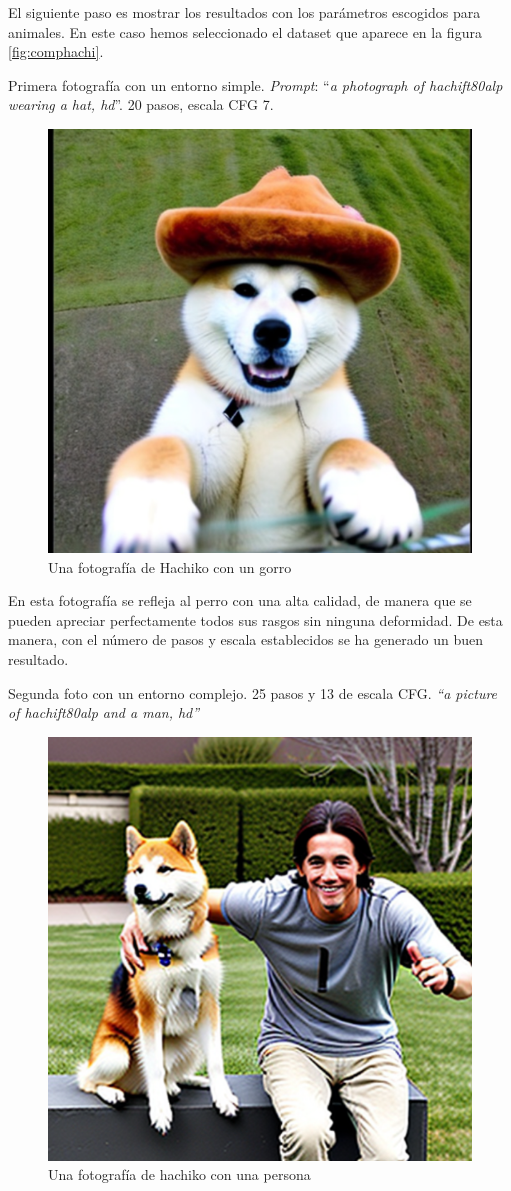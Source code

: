 El siguiente paso es mostrar los resultados con los parámetros escogidos para animales. En este caso hemos seleccionado el dataset que aparece en la figura \ref{fig:comphachi}.

Primera fotografía con un entorno simple. \textit{Prompt}: ``\textit{a photograph of hachift80alp wearing a hat, hd}''. 20 pasos, escala CFG 7.


\begin{figure}[!htb]
	\centering
	\includegraphics[width = 0.5
	\textwidth]{Imagenes/Vectorial/hachigorrito.png}
	\caption{Una fotografía de Hachiko con un gorro}
	\label{fig:cvbasilnublado}
\end{figure}

En esta fotografía se refleja al perro con una alta calidad, de manera que se pueden apreciar perfectamente todos sus rasgos sin ninguna deformidad. De esta manera, con el número de pasos y escala establecidos se ha generado un buen resultado.

Segunda foto con un entorno complejo. 25 pasos y 13 de escala CFG.
\textit{``a picture of hachift80alp and a man, hd''}

\begin{figure}[!htb]
	\centering
	\includegraphics[width = 0.5
	\textwidth]{Imagenes/Vectorial/hachiconpersona.png}
	\caption{Una fotografía de hachiko con una persona}
	\label{fig:cvbasilnublado}
\end{figure}

